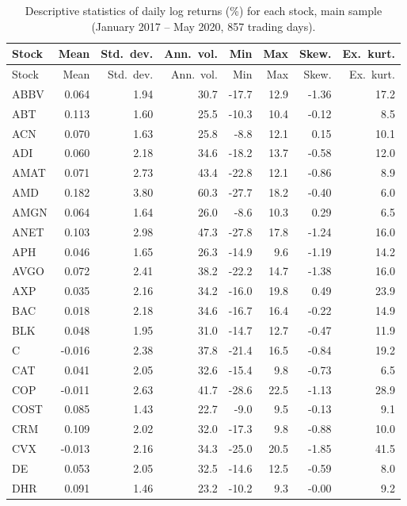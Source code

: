 \documentclass[12pt,a4paper]{article}
\begin{document}
\begin{longtable}{lrrrrrrr}
\caption[Descriptive statistics by stock]{Descriptive statistics of daily log returns (\%) for each stock, main sample (January 2017 -- May 2020, 857 trading days).}\label{tab:app-stock-desc}\\
\toprule
Stock & Mean & Std.\ dev. & Ann.\ vol. & Min & Max & Skew. & Ex.\ kurt. \\
\midrule
\endfirsthead
\toprule
Stock & Mean & Std.\ dev. & Ann.\ vol. & Min & Max & Skew. & Ex.\ kurt. \\
\midrule
\endhead
\bottomrule
\endfoot
ABBV & 0.064 & 1.94 & 30.7 & -17.7 & 12.9 & -1.36 & 17.2 \\
ABT & 0.113 & 1.60 & 25.5 & -10.3 & 10.4 & -0.12 & 8.5 \\
ACN & 0.070 & 1.63 & 25.8 & -8.8 & 12.1 & 0.15 & 10.1 \\
ADI & 0.060 & 2.18 & 34.6 & -18.2 & 13.7 & -0.58 & 12.0 \\
AMAT & 0.071 & 2.73 & 43.4 & -22.8 & 12.1 & -0.86 & 8.9 \\
AMD & 0.182 & 3.80 & 60.3 & -27.7 & 18.2 & -0.40 & 6.0 \\
AMGN & 0.064 & 1.64 & 26.0 & -8.6 & 10.3 & 0.29 & 6.5 \\
ANET & 0.103 & 2.98 & 47.3 & -27.8 & 17.8 & -1.24 & 16.0 \\
APH & 0.046 & 1.65 & 26.3 & -14.9 & 9.6 & -1.19 & 14.2 \\
AVGO & 0.072 & 2.41 & 38.2 & -22.2 & 14.7 & -1.38 & 16.0 \\
AXP & 0.035 & 2.16 & 34.2 & -16.0 & 19.8 & 0.49 & 23.9 \\
BAC & 0.018 & 2.18 & 34.6 & -16.7 & 16.4 & -0.22 & 14.9 \\
BLK & 0.048 & 1.95 & 31.0 & -14.7 & 12.7 & -0.47 & 11.9 \\
C & -0.016 & 2.38 & 37.8 & -21.4 & 16.5 & -0.84 & 19.2 \\
CAT & 0.041 & 2.05 & 32.6 & -15.4 & 9.8 & -0.73 & 6.5 \\
COP & -0.011 & 2.63 & 41.7 & -28.6 & 22.5 & -1.13 & 28.9 \\
COST & 0.085 & 1.43 & 22.7 & -9.0 & 9.5 & -0.13 & 9.1 \\
CRM & 0.109 & 2.02 & 32.0 & -17.3 & 9.8 & -0.88 & 10.0 \\
CVX & -0.013 & 2.16 & 34.3 & -25.0 & 20.5 & -1.85 & 41.5 \\
DE & 0.053 & 2.05 & 32.5 & -14.6 & 12.5 & -0.59 & 8.0 \\
DHR & 0.091 & 1.46 & 23.2 & -10.2 & 9.3 & -0.00 & 9.2 \\

\end{longtable}
\end{document}
